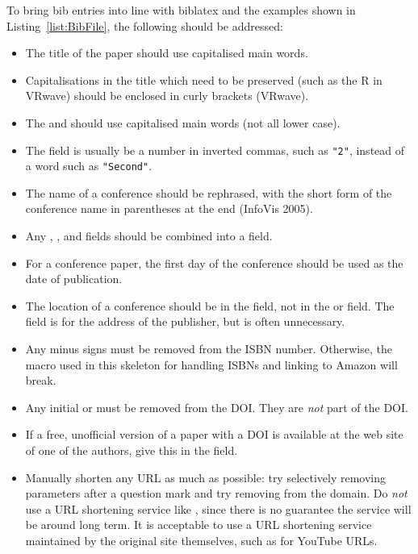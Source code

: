 To bring bib entries into line with biblatex and the examples shown in
Listing~\ref{list:BibFile}, the following should be addressed:
\begin{itemize}
\item The title of the paper should use capitalised main words.

\item Capitalisations in the title which need to be preserved (such as
  the R in VRwave) should be enclosed in curly brackets ({VRwave}).

\item The  and  should use
  capitalised main words (not all lower case).

\item The  field is usually be a number in inverted
  commas, such as \verb|"2"|, instead of a word such as
  \verb|"Second"|.

\item The name of a conference should be rephrased, with the short
  form of the conference name in parentheses at the end (InfoVis
  2005).

\item Any , , and 
  fields should be combined into a  field.

\item For a conference paper, the first day of the conference
  should be used as the date of publication.

\item The location of a conference should be in the 
  field, not in the  or  field. The
   field is for the address of the publisher, but is
  often unnecessary.


\item Any minus signs must be removed from the ISBN number.
  Otherwise, the macro used in this skeleton for handling ISBNs and
  linking to Amazon will break.

\item Any initial  or
   must be removed from
  the DOI. They are \emph{not} part of the DOI.

\item If a free, unofficial version of a paper with a DOI is available
  at the web site of one of the authors, give this in the 
  field.

\item Manually shorten any URL as much as possible: try selectively
  removing parameters after a question mark and try removing
   from the domain. Do \emph{not} use a URL shortening
  service like , since there is no guarantee the
  service will be around long term. It is acceptable to use a URL
  shortening service maintained by the original site themselves, such
  as  for YouTube URLs.

\end{itemize}








